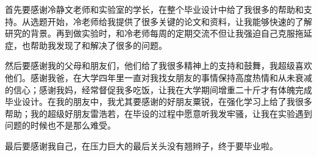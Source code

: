 
\begin{thanks}

首先要感谢冷静文老师和实验室的学长，在整个毕业设计中给了我很多的帮助和支持。从选题开始，冷老师给我提供了很多关键的论文和资料，让我能够快速的了解研究的背景。再到做实验时，和冷老师每周的定期交流不但让我强迫自己克服拖延症，也帮助我发现了和解决了很多的问题。

然后要感谢我的父母和朋友们，他们给了我很多精神上的支持和鼓舞，我超级喜欢他们。感谢我爸，在大学四年里一直对我找女朋友的事情保持高度热情和从未衰减的信心；感谢我妈，经常督促我多吃饭，让我在大学期间增重二十斤才有体魄完成毕业设计。在我的朋友中，我尤其要感谢的好朋友粟锐，在强化学习上给了我很多帮助；我的超级好朋友雷浩若，在毕设的过程中愿意听我发牢骚，让我在实验遇到问题的时候也不是那么难受。

最后要感谢我自己，在压力巨大的最后关头没有翘辫子，终于要毕业啦。

\end{thanks}
